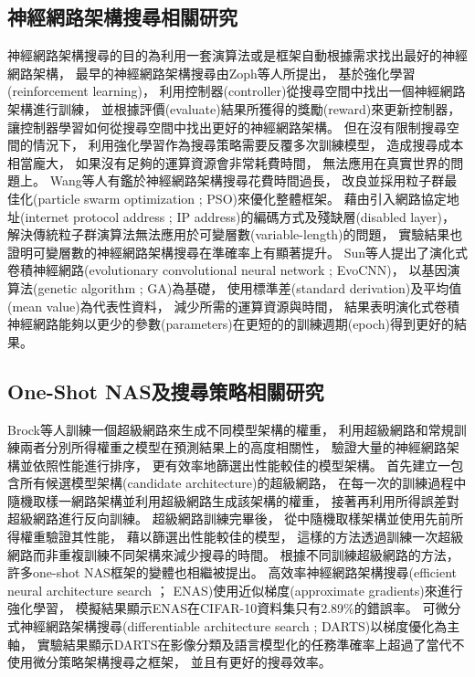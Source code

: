 \documentclass[a4paper,14pt]{extarticle}
\begin{document}
        \subsection{神經網路架構搜尋相關研究}
            
            神經網路架構搜尋的目的為利用一套演算法或是框架自動根據需求找出最好的神經網路架構，
            最早的神經網路架構搜尋由Zoph等人\cite{zoph2016neural}所提出，
            基於強化學習(reinforcement learning)，
            利用控制器(controller)從搜尋空間中找出一個神經網路架構進行訓練，
            並根據評價(evaluate)結果所獲得的獎勵(reward)來更新控制器，
            讓控制器學習如何從搜尋空間中找出更好的神經網路架構。
            但在沒有限制搜尋空間的情況下，
            利用強化學習作為搜尋策略需要反覆多次訓練模型，
            造成搜尋成本相當龐大，
            如果沒有足夠的運算資源會非常耗費時間，
            無法應用在真實世界的問題上。
            Wang等人\cite{8477735}有鑑於神經網路架構搜尋花費時間過長，
            改良並採用粒子群最佳化(particle swarm optimization ; PSO)來優化整體框架。
            藉由引入網路協定地址(internet protocol address ; IP address)的編碼方式及殘缺層(disabled layer)，
            解決傳統粒子群演算法無法應用於可變層數(variable-length)的問題，
            實驗結果也證明可變層數的神經網路架構搜尋在準確率上有顯著提升。
            Sun等人\cite{8712430}提出了演化式卷積神經網路(evolutionary convolutional neural network ; EvoCNN)，
            以基因演算法(genetic algorithm ; GA)為基礎，
            使用標準差(standard derivation)及平均值(mean value)為代表性資料，
            減少所需的運算資源與時間，
            結果表明演化式卷積神經網路能夠以更少的參數(parameters)在更短的的訓練週期(epoch)得到更好的結果。

        \subsection{One-Shot NAS及搜尋策略相關研究}
            
            Brock等人\cite{brock2017smash}訓練一個超級網路來生成不同模型架構的權重，
            利用超級網路和常規訓練兩者分別所得權重之模型在預測結果上的高度相關性，
            驗證大量的神經網路架構並依照性能進行排序，
            更有效率地篩選出性能較佳的模型架構。
            首先建立一包含所有候選模型架構(candidate architecture)的超級網路，
            在每一次的訓練過程中隨機取樣一網路架構並利用超級網路生成該架構的權重，
            接著再利用所得誤差對超級網路進行反向訓練。
            超級網路訓練完畢後，
            從中隨機取樣架構並使用先前所得權重驗證其性能，
            藉以篩選出性能較佳的模型，
            這樣的方法透過訓練一次超級網路而非重複訓練不同架構來減少搜尋的時間。
            根據不同訓練超級網路的方法，
            許多one-shot NAS框架的變體也相繼被提出。
            高效率神經網路架構搜尋(efficient neural architecture search ； ENAS)使用近似梯度(approximate gradients)\cite{pedregosa2016hyperparameter}來進行強化學習，
            模擬結果顯示ENAS在CIFAR-10資料集只有2.89\%的錯誤率。
            可微分式神經網路架構搜尋(differentiable architecture search ; DARTS)\cite{liu2018darts}以梯度優化為主軸，
            實驗結果顯示DARTS在影像分類及語言模型化的任務準確率上超過了當代不使用微分策略架構搜尋之框架，
            並且有更好的搜尋效率。
            
\end{document}
